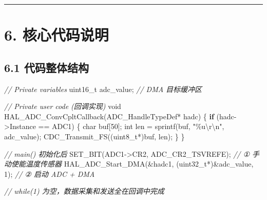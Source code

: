 \documentclass[
  chinese,
  UTF8,
  oneside,
  openany]{ctexbook}
\newenvironment{Shaded}{}{}
\newcommand{\CommentTok}[1]{\textcolor[rgb]{0.38,0.63,0.69}{\textit{#1}}}
\newcommand{\ControlFlowTok}[1]{\textcolor[rgb]{0.00,0.44,0.13}{\textbf{#1}}}
\newcommand{\DataTypeTok}[1]{\textcolor[rgb]{0.56,0.13,0.00}{#1}}
\newcommand{\DecValTok}[1]{\textcolor[rgb]{0.25,0.63,0.44}{#1}}
\newcommand{\NormalTok}[1]{#1}
\newcommand{\OperatorTok}[1]{\textcolor[rgb]{0.40,0.40,0.40}{#1}}
\newcommand{\SpecialCharTok}[1]{\textcolor[rgb]{0.25,0.44,0.63}{#1}}
\newcommand{\StringTok}[1]{\textcolor[rgb]{0.25,0.44,0.63}{#1}}
\begin{document}
\begin{center}\rule{0.5\linewidth}{0.5pt}\end{center}

\section{6. 核心代码说明}\label{ux6838ux5fc3ux4ee3ux7801ux8bf4ux660e-2}

\subsection{6.1
代码整体结构}\label{ux4ee3ux7801ux6574ux4f53ux7ed3ux6784}

\begin{Shaded}
\begin{Highlighting}[]
\CommentTok{// Private variables}
\DataTypeTok{uint16\_t}\NormalTok{ adc\_value}\OperatorTok{;}   \CommentTok{// DMA 目标缓冲区}

\CommentTok{// Private user code (回调实现)}
\DataTypeTok{void}\NormalTok{ HAL\_ADC\_ConvCpltCallback}\OperatorTok{(}\NormalTok{ADC\_HandleTypeDef}\OperatorTok{*}\NormalTok{ hadc}\OperatorTok{)} \OperatorTok{\{}
    \ControlFlowTok{if} \OperatorTok{(}\NormalTok{hadc}\OperatorTok{{-}\textgreater{}}\NormalTok{Instance }\OperatorTok{==}\NormalTok{ ADC1}\OperatorTok{)} \OperatorTok{\{}
        \DataTypeTok{char}\NormalTok{ buf}\OperatorTok{[}\DecValTok{50}\OperatorTok{];}
        \DataTypeTok{int}\NormalTok{ len }\OperatorTok{=}\NormalTok{ sprintf}\OperatorTok{(}\NormalTok{buf}\OperatorTok{,} \StringTok{"}\SpecialCharTok{\%u\textbackslash{}r\textbackslash{}n}\StringTok{"}\OperatorTok{,}\NormalTok{ adc\_value}\OperatorTok{);}
\NormalTok{        CDC\_Transmit\_FS}\OperatorTok{((}\DataTypeTok{uint8\_t}\OperatorTok{*)}\NormalTok{buf}\OperatorTok{,}\NormalTok{ len}\OperatorTok{);}
    \OperatorTok{\}}
\OperatorTok{\}}

\CommentTok{// main() 初始化后}
\NormalTok{SET\_BIT}\OperatorTok{(}\NormalTok{ADC1}\OperatorTok{{-}\textgreater{}}\NormalTok{CR2}\OperatorTok{,}\NormalTok{ ADC\_CR2\_TSVREFE}\OperatorTok{);}            \CommentTok{// ① 手动使能温度传感器}
\NormalTok{HAL\_ADC\_Start\_DMA}\OperatorTok{(\&}\NormalTok{hadc1}\OperatorTok{,} \OperatorTok{(}\DataTypeTok{uint32\_t}\OperatorTok{*)\&}\NormalTok{adc\_value}\OperatorTok{,} \DecValTok{1}\OperatorTok{);}  \CommentTok{// ② 启动 ADC + DMA}

\CommentTok{// while(1) 为空，数据采集和发送全在回调中完成}
\end{Highlighting}
\end{Shaded}
\end{document}
